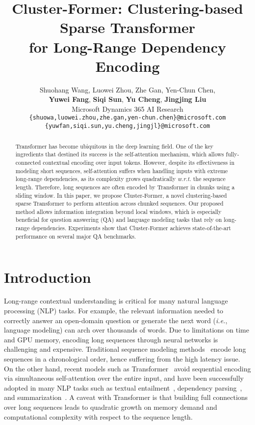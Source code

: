 \documentclass[11pt,a4paper]{article}
\title{Cluster-Former: Clustering-based Sparse Transformer \\
for Long-Range Dependency Encoding}
\author{Shuohang Wang, Luowei Zhou, Zhe Gan, Yen-Chun Chen,\\  \textbf{Yuwei Fang}, \textbf{Siqi Sun}, \textbf{Yu Cheng}, \textbf{Jingjing Liu} \\
  Microsoft Dynamics 365 AI Research \\
  \small{ \texttt{\{shuowa,luowei.zhou,zhe.gan,yen-chun.chen\}@microsoft.com} }\\
  \small{ \texttt{\{yuwfan,siqi.sun,yu.cheng,jingjl\}@microsoft.com} }}
\date{}
\begin{document}
\maketitle
\begin{abstract}
Transformer has become ubiquitous in the deep learning field. One of the key ingredients that destined its success is the self-attention mechanism, which allows fully-connected contextual encoding over input tokens. 
However, despite its effectiveness in modeling short sequences, self-attention suffers when handling inputs with extreme long-range dependencies, as its complexity grows quadratically
\textit{w.r.t.} the sequence length.
Therefore, long sequences are often encoded by Transformer in chunks using a sliding window.
In this paper, we propose Cluster-Former, a novel clustering-based sparse Transformer to perform attention across chunked sequences.
Our proposed method allows information integration beyond local windows, which is especially beneficial for question answering (QA) and language modeling tasks that rely on long-range dependencies. Experiments show that Cluster-Former achieves state-of-the-art performance on several major QA benchmarks.

\end{abstract}



\section{Introduction}
Long-range contextual understanding is critical for many natural language processing (NLP) tasks.
For example, the relevant information needed to correctly answer an open-domain question or generate the next word (\emph{i.e.}, language modeling) can arch over thousands of words. 
Due to limitations on time and GPU memory, encoding long sequences through neural networks is challenging and expensive.
Traditional sequence modeling methods~\cite{hochreiter1997long} encode long sequences in a chronological order, hence suffering from the high latency issue. On the other hand, recent models such as Transformer~\cite{transformer} avoid sequential encoding via simultaneous self-attention over the entire input, and have been successfully adopted in many NLP tasks such as textual entailment~\cite{bert}, dependency parsing~\cite{zhou2019head}, and summarization~\cite{bart}. A caveat with Transformer is that building full connections over long sequences leads to quadratic growth on memory demand and computational complexity with respect to the sequence length.
\end{document}
